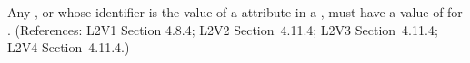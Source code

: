Any \Compartment, \Species or \Parameter whose identifier is the value of a
 attribute in a \RateRule, must have a value of 
for .  (References: L2V1 Section 4.8.4; L2V2 Section~4.11.4;
L2V3 Section~4.11.4; L2V4 Section~4.11.4.)
